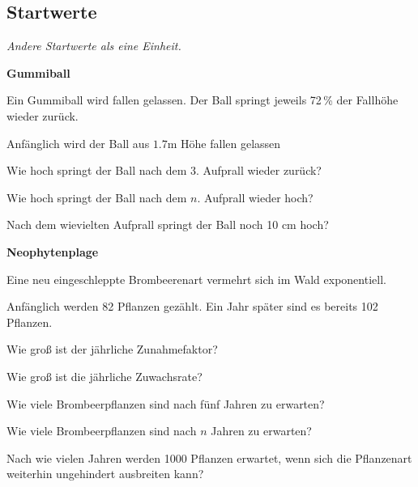 \subsection{Startwerte}
\textit{Andere Startwerte als eine Einheit.}


\bbwActAufgabenNr{} \textbf{Gummiball}

Ein Gummiball wird fallen gelassen. Der Ball springt jeweils 72\,\% der Fallhöhe wieder zurück.

Anfänglich wird der Ball aus $1.7 \textrm{m}$ Höhe fallen gelassen

\begin{bbwAufgabenBlock}

\item Wie hoch springt der Ball nach dem 3. Aufprall wieder zurück?
\item Wie hoch springt der Ball nach dem $n$. Aufprall wieder hoch?
\item Nach dem wievielten Aufprall springt der Ball noch 10 cm hoch?
\end{bbwAufgabenBlock}
\platzFuerBerechnungenBisEndeSeite{}



\bbwActAufgabenNr{} \textbf{Neophytenplage}

Eine neu eingeschleppte Brombeerenart vermehrt sich im Wald exponentiell.

Anfänglich werden 82 Pflanzen gezählt. Ein Jahr später sind es bereits 102 Pflanzen.

\begin{bbwAufgabenBlock}

\item Wie groß ist der jährliche Zunahmefaktor?
\item Wie groß ist die jährliche Zuwachsrate?
      
\item Wie viele Brombeerpflanzen sind nach fünf Jahren zu erwarten?

\item Wie viele Brombeerpflanzen sind nach $n$ Jahren zu erwarten?
\item Nach wie vielen Jahren werden 1000 Pflanzen erwartet, wenn sich die Pflanzenart weiterhin ungehindert ausbreiten kann?
\end{bbwAufgabenBlock}
\platzFuerBerechnungenBisEndeSeite{}




